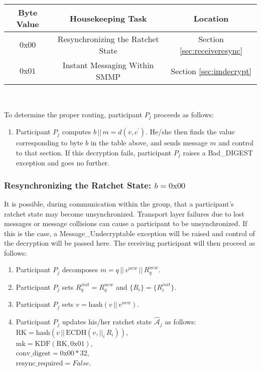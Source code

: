 \documentclass[%
preprint,
amsmath,amssymb,
aps,
prb,
floatfix,
]{revtex4-1}
\begin{document}
\begin{centering}
\begin{tabular}{|c|c|c|}
\hline
Byte Value & Housekeeping Task & Location \\
\hline
$0\mathrm{x}00$ & Resynchronizing the Ratchet State  & Section \ref{sec:receiveresync}\\
$0\mathrm{x}01$ & Instant Messaging Within SMMP & Section \ref{sec:imdecrypt}\\
\hline
\end{tabular} \\
\end{centering}
\bigskip
To determine the proper routing, participant $P_j$ proceeds as follows:
\begin{enumerate}
\item Participant $P_j$ computes $b \, || \, m = d(v, c^\prime)$. He/she then
finds the value corresponding to byte $b$ in the table above, and sends message
$m$ and control to that section.
If this decryption fails, participant $P_j$ raises a Bad\_DIGEST exception and
goes no further.
\end{enumerate}
\subsubsection{\label{sec:receiveresync}Resynchronizing the Ratchet State: $b =
0\mathrm{x}00$}
It is possible, during communication within the group, that a participant's
ratchet state may become unsynchronized. Transport layer failures due to lost
messages or message collisions can cause a participant to be unsynchronized. If
this is the case, a Message\_Undecryptable exception will be raised
and control of the decryption will be passed here. The receiving participant
will then proceed as follows:
\begin{enumerate}
\item Participant $P_j$ decomposes $m = q \, || \, v^{new} \, || \, R_q^{new}$.
\item Participant $P_j$ sets $R_q^{init} = R_q^{new}$ and $\{R_i\} =
\{R_i^{init}\}$.
\item Participant $P_j$ sets $v = \mathrm{hash}(v \, || \, v^{new})$.
\item Participant $P_j$ updates his/her ratchet state
$\mathcal{\hat{A}}_j$ as follows:\\
$\mathrm{RK} = \mathrm{hash}(v \, || \, \mathrm{ECDH}(v, ||_i
\, R_i))$, \\
$\mathrm{mk} = \mathrm{KDF}(\mathrm{RK}, 0\mathrm{x}01)$, \\
$\mathrm{conv\_digest} = 0\mathrm{x}00 * 32$, \\
$\mathrm{resync\_required} = False$.
\end{enumerate}
\end{document}
